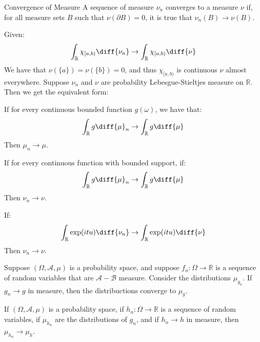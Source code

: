     \begin{ldefinition}{Convergence of Measure}
        A sequence of measure $\nu_{n}$ converges to a
        measure $\nu$ if, for all measure sets $B$ such
        that $\nu(\partial{B})=0$, it is true that
        $\nu_{n}(B)\rightarrow\nu(B)$.
    \end{ldefinition}
    Given:
    \begin{equation}
        \int_{\mathbb{R}}\chi_{[a,b)}\diff{\nu_{n}}
        \rightarrow\int_{\mathbb{R}}\chi_{[a,b)}\diff{\nu}
    \end{equation}
    We have that $\nu(\{a\})=\nu(\{b\})=0$, and thus
    $\chi_{[a,b)}$ is continuous $\nu$ almost everywhere.
    Suppose $\nu_{n}$ and $\nu$ are probability
    Lebesgue-Stieltjes measure on $\mathbb{R}$. Then we
    get the equivalent form:
    \begin{theorem}
        If for every continuous bounded function $g(\omega)$,
        we have that:
        \begin{equation}
            \int_{\mathbb{R}}g\diff{\mu}_{n}\rightarrow
            \int_{\mathbb{R}}g\diff{\mu}
        \end{equation}
        Then $\mu_{n}\rightarrow\mu$.
    \end{theorem}
    \begin{theorem}
        If for every continuous function with bounded support,
        if:
        \begin{equation}
            \int_{\mathbb{R}}g\diff{\mu}_{n}\rightarrow
            \int_{\mathbb{R}}g\diff{\mu}
        \end{equation}
        Then $\nu_{n}\rightarrow\nu$.
    \end{theorem}
    \begin{theorem}
        If:
        \begin{equation}
            \int_{\mathbb{R}}\exp(itu)\diff{\nu_{n}}\rightarrow
            \int_{\mathbb{R}}\exp(itu)\diff{\nu}
        \end{equation}
        Then $\nu_{n}\rightarrow\nu$.
    \end{theorem}
    Suppose $(\Omega,\mathcal{A},\mu)$ is a probability space,
    and suppose $f_{n}:\Omega\rightarrow\mathbb{R}$ is a
    sequence of random variables that are
    $\mathcal{A}-\mathcal{B}$ measure. Consider the
    distributions $\mu_{g_{n}}$. If $g_{n}\rightarrow{g}$ in
    measure, then the distribuctions converge to $\mu_{g}$.
    \begin{theorem}
        If $(\Omega,\mathcal{A},\mu)$ is a probability space,
        if $h_{n}:\Omega\rightarrow\mathbb{R}$ is a
        sequence of random variables, if $\mu_{h_{n}}$ are the
        distributions of $g_{n}$, and if $h_{n}\rightarrow{h}$
        in measure, then $\mu_{h_{n}}\rightarrow\mu_{h}$.
    \end{theorem}
